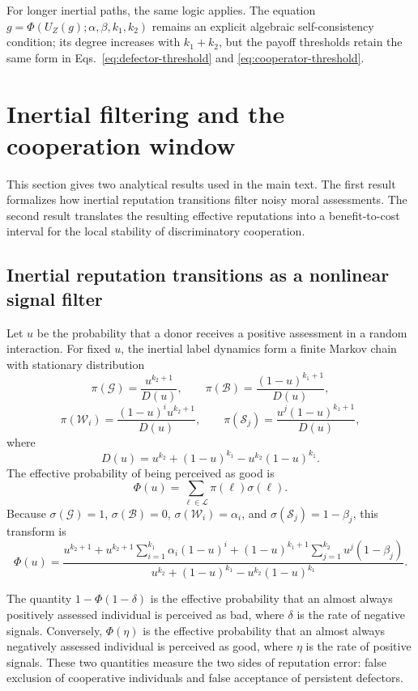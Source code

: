 \documentclass[fleqn,10pt]{wlscirep}
\begin{document}
For longer inertial paths, the same logic applies. The equation $g=\Phi(U_Z(g);\alpha,\beta,k_1,k_2)$ remains an explicit algebraic self-consistency condition; its degree increases with $k_1+k_2$, but the payoff thresholds retain the same form in Eqs.~\eqref{eq:defector-threshold} and \eqref{eq:cooperator-threshold}.


\section*{Inertial filtering and the cooperation window}

This section gives two analytical results used in the main text. The first result formalizes how inertial reputation transitions filter noisy moral assessments. The second result translates the resulting effective reputations into a benefit-to-cost interval for the local stability of discriminatory cooperation.

\subsection*{Inertial reputation transitions as a nonlinear signal filter}

Let $u$ be the probability that a donor receives a positive assessment in a random interaction. For fixed $u$, the inertial label dynamics form a finite Markov chain with stationary distribution
\[
\pi(\mathcal{G})=\frac{u^{k_2+1}}{D(u)},\qquad
\pi(\mathcal{B})=\frac{(1-u)^{k_1+1}}{D(u)},
\]
\[
\pi(\mathcal{W}_i)=\frac{(1-u)^iu^{k_2+1}}{D(u)},\qquad
\pi(\mathcal{S}_j)=\frac{u^j(1-u)^{k_1+1}}{D(u)},
\]
where
\[
D(u)=u^{k_2}+(1-u)^{k_1}-u^{k_2}(1-u)^{k_1}.
\]
The effective probability of being perceived as good is
\[
\Phi(u)=\sum_{\ell\in\mathcal{L}}\pi(\ell)\sigma(\ell).
\]
Because $\sigma(\mathcal{G})=1$, $\sigma(\mathcal{B})=0$, $\sigma(\mathcal{W}_i)=\alpha_i$, and $\sigma(\mathcal{S}_j)=1-\beta_j$, this transform is
\begin{equation}
\label{eq:phi-filtering-definition}
\Phi(u)=
\frac{
u^{k_2+1}
+u^{k_2+1}\sum_{i=1}^{k_1}\alpha_i(1-u)^i
+(1-u)^{k_1+1}\sum_{j=1}^{k_2}u^j(1-\beta_j)
}{
u^{k_2}+(1-u)^{k_1}-u^{k_2}(1-u)^{k_1}
}.
\end{equation}

The quantity $1-\Phi(1-\delta)$ is the effective probability that an almost always positively assessed individual is perceived as bad, where $\delta$ is the rate of negative signals. Conversely, $\Phi(\eta)$ is the effective probability that an almost always negatively assessed individual is perceived as good, where $\eta$ is the rate of positive signals. These two quantities measure the two sides of reputation error: false exclusion of cooperative individuals and false acceptance of persistent defectors.
\end{document}
